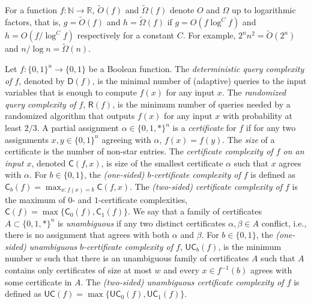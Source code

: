 \documentclass[11pt]{article}
\newcommand{\cert}{\mathsf{C}}
\newcommand{\ucert}{\mathsf{UC}}
\newcommand{\D}{\mathsf{D}}
\newcommand{\R}{\mathsf{R}}
\numberwithin{equation}{section}
\begin{document}
For a function $f:\mathbb{N}\to\mathbb{R}$, $\tilde O(f)$ and $\tilde\Omega(f)$ denote $O$ and $\Omega$ up to logarithmic factors,
that is, $g = \tilde O(f)$ and $h = \tilde \Omega(f)$ if $g = O(f\log^Cf)$ and $h = O(f/\log^Cf)$ respectively for a constant $C$.
For example, $2^nn^2=\tilde O(2^n)$ and $n/\log n=\tilde\Omega(n)$.

Let $f\colon\{0,1\}^n\to\{0,1\}$ be a Boolean function. The \emph{deterministic query complexity of $f$}, denoted by $\D(f)$, is the minimal number of (adaptive) queries to the input variables that is enough to compute $f(x)$ for any input $x$.
The \emph{randomized query complexity of $f$}, $\R(f)$, is 
the minimum number of queries needed by a randomized algorithm
that outputs $f(x)$ for any input $x$ with probability at least $2/3$.
A partial assignment $\alpha\in\{0,1,{*}\}^n$ is a \emph{certificate} for $f$ if for any two assignments $x,y\in\{0,1\}^n$ agreeing with $\alpha$, $f(x) = f(y)$. The \emph{size} of a certificate is the number of non-star entries.
The \emph{certificate complexity of $f$ on an input $x$}, denoted $\cert(f,x)$, is size of the smallest certificate $\alpha$ such that $x$ agrees with $\alpha$. 
For $b\in\{0,1\}$, the \emph{(one-sided) $b$-certificate complexity of $f$} is defined as $\cert_b(f) = \max_{x: f(x) = b} \cert(f,x)$. 
The \emph{(two-sided) certificate complexity of $f$} is the maximum of $0$- and $1$-certificate complexities, $\cert(f) = \max\{\cert_0(f),\cert_1(f)\}$. 
We say that a family of certificates $A\subset \{0,1,*\}^n$ is \emph{unambiguous} if any two distinct certificates $\alpha,\beta\in A$ conflict, i.e., there is no assignment that agrees with both $\alpha$ and $\beta$. 
For $b\in\{0,1\}$, the \emph{(one-sided) unambiguous $b$-certificate complexity of $f$}, $\ucert_b(f)$, is the minimum number $w$ such that there is an unambiguous family of certificates $A$ such that $A$ contains only certificates of size at most $w$ and every $x\in f^{-1}(b)$ agrees with some certificate in $A$. 
The \emph{(two-sided) unambiguous certificate complexity of $f$} is defined as $\ucert(f) = \max\{\ucert_0(f), \ucert_1(f)\}$.
\end{document}
